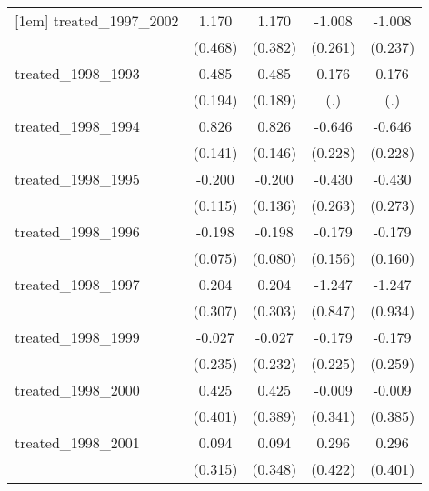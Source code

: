 {\begin{tabular}{l*{4}{c}}
[1em]
treated\_1997\_2002&       1.170\sym{*}  &       1.170\sym{**} &      -1.008\sym{***}&      -1.008\sym{***}\\
            &     (0.468)         &     (0.382)         &     (0.261)         &     (0.237)         \\
[1em]
treated\_1998\_1993&       0.485\sym{*}  &       0.485\sym{*}  &       0.176         &       0.176         \\
            &     (0.194)         &     (0.189)         &         (.)         &         (.)         \\
[1em]
treated\_1998\_1994&       0.826\sym{***}&       0.826\sym{***}&      -0.646\sym{**} &      -0.646\sym{**} \\
            &     (0.141)         &     (0.146)         &     (0.228)         &     (0.228)         \\
[1em]
treated\_1998\_1995&      -0.200         &      -0.200         &      -0.430         &      -0.430         \\
            &     (0.115)         &     (0.136)         &     (0.263)         &     (0.273)         \\
[1em]
treated\_1998\_1996&      -0.198\sym{**} &      -0.198\sym{*}  &      -0.179         &      -0.179         \\
            &     (0.075)         &     (0.080)         &     (0.156)         &     (0.160)         \\
[1em]
treated\_1998\_1997&       0.204         &       0.204         &      -1.247         &      -1.247         \\
            &     (0.307)         &     (0.303)         &     (0.847)         &     (0.934)         \\
[1em]
treated\_1998\_1999&      -0.027         &      -0.027         &      -0.179         &      -0.179         \\
            &     (0.235)         &     (0.232)         &     (0.225)         &     (0.259)         \\
[1em]
treated\_1998\_2000&       0.425         &       0.425         &      -0.009         &      -0.009         \\
            &     (0.401)         &     (0.389)         &     (0.341)         &     (0.385)         \\
[1em]
treated\_1998\_2001&       0.094         &       0.094         &       0.296         &       0.296         \\
            &     (0.315)         &     (0.348)         &     (0.422)         &     (0.401)         \\

\end{tabular}}
